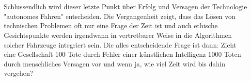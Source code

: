 \documentclass[10pt,a4paper]{article}
\begin{document}
\\
\\
Schlussendlich wird dieser letzte Punkt über Erfolg und Versagen der Technologie "autonomes Fahren" entscheiden. Die Vergangenheit zeigt, dass das Lösen von technischen Problemen oft nur eine Frage der Zeit ist und auch ethische Gesichtspunkte werden irgendwann in vertretbarer Weise in die Algorithmen solcher Fahrzeuge integriert sein. Die alles entscheidende Frage ist dann: Zieht eine Gesellschaft 100 Tote durch Fehler einer künstlichen Intelligenz 1000 Toten durch menschliches Versagen vor und wenn ja, wie viel Zeit wird bis dahin vergehen? 

\printbibliography
\end{document}
